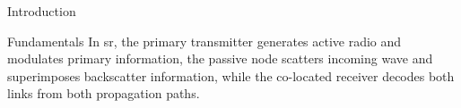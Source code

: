 \documentclass[journal]{IEEEtran}
\begin{document}
\begin{section}{Introduction}
\begin{subsection}{Fundamentals}
		In \gls{sr}, the primary transmitter generates active radio and modulates primary information, the passive node scatters incoming wave and superimposes backscatter information, while the co-located receiver decodes both links from both propagation paths.

\end{subsection}
\end{section}
\end{document}
